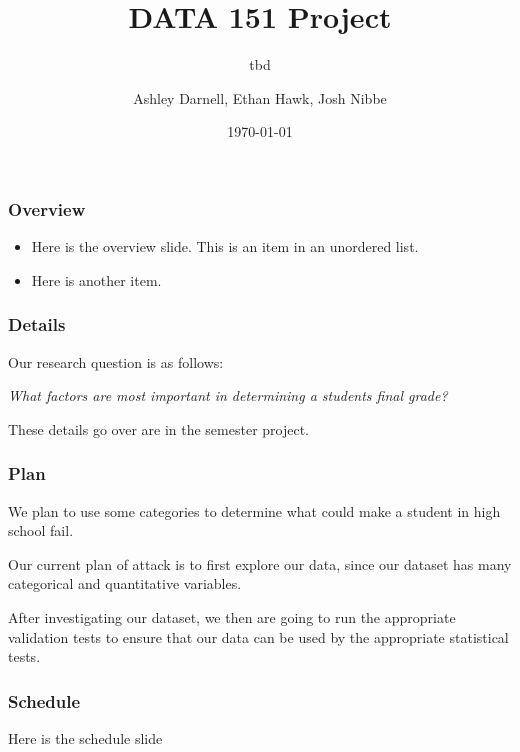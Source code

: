 \documentclass{beamer}
\title{DATA 151 Project}
\subtitle{tbd}
\author{Ashley Darnell, Ethan Hawk, Josh Nibbe}
\institute{Valparaiso University}
\date{\today}
\begin{document}
\begin{frame}
\titlepage
\end{frame}


\begin{frame}
\frametitle{Overview}
  \begin{itemize}
    \item Here is the overview slide. This is an item in an unordered list.

    \item Here is another item.
  \end{itemize}
\end{frame}


\begin{frame}
\frametitle{Details}
Our research question is as follows:

  \begin{center}
    \textit{What factors are most important in determining a students final grade?}
  \end{center}


These details go over are in the semester project.  
\end{frame}


\begin{frame}
\frametitle{Plan}
We plan to use some categories to determine what could make a student in high school fail. 

Our current plan of attack is to first explore our data, since our dataset has many categorical and 
quantitative variables.

After investigating our dataset, we then are going to run the appropriate validation tests to ensure that our data
can be used by the appropriate statistical tests.


\end{frame}

\begin{frame}
\frametitle{Schedule}
Here is the schedule slide
\end{frame}
\end{document}
